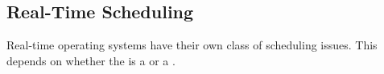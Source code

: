 \subsection{Real-Time Scheduling}\label{subsec:Real_Time_Scheduling}
Real-time operating systems have their own class of scheduling issues.
This depends on whether the  is a  or a .


